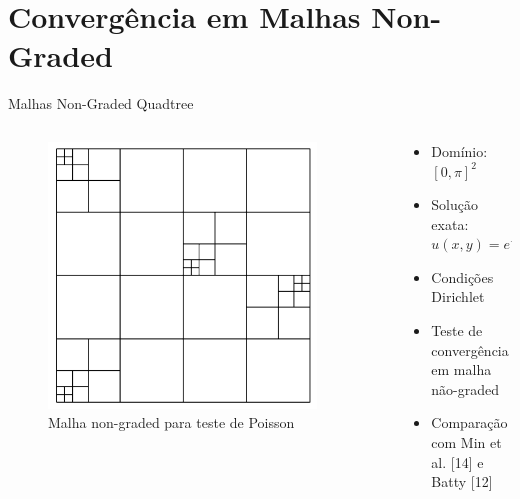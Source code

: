 \documentclass[../main/main.tex]{subfiles}
\begin{document}
\section{Convergência em Malhas Non-Graded}


\begin{frame}{Malhas Non-Graded Quadtree}
\begin{columns}[T]
\begin{column}{0.4\textwidth}
\begin{figure}
\centering
\includegraphics[width=0.9\textwidth]{imgs/figura5.png}
\caption{Malha non-graded para teste de Poisson}
\end{figure}
\end{column}
\begin{column}{0.6\textwidth}
\begin{itemize}
\item Domínio: $[0, \pi]^2$
\item Solução exata: $u(x, y) = e^{-x-y}$
\item Condições Dirichlet
\item Teste de convergência em malha não-graded
\item Comparação com Min et al. [14] e Batty [12]
\end{itemize}
\end{column}
\end{columns}
\end{frame}
\end{document}
